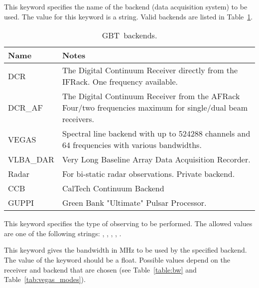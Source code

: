 \begin{description}[leftmargin=*,font=\bfseries\large]
\item[backend] This keyword specifies the name of the backend (data acquisition
system) to be used.  The value for this keyword is a string.  Valid backends are
listed in Table~\ref{table:backends}.

\begin{table}[!h]
\setlength{\abovecaptionskip}{0pt}\setlength{\belowcaptionskip}{0pt}
\begin{center}
\caption[GBT backends]{\gls{GBT}\ backends.\label{table:backends}}
\begin{tabular}{@{}l p{}}
\toprule
Name & Notes \\ \midrule
DCR & The Digital Continuum Receiver directly from the \gls{IFRack}.\newline
One frequency available.\\
\midrule
DCR\_AF & The Digital Continuum Receiver from the \gls{AFRack} \newline
          Four/two frequencies maximum for single/dual beam receivers. \\
\midrule
VEGAS  & Spectral line backend with up to 524288 channels and 64 \newline
frequencies with various bandwidths.\\
\midrule
VLBA\_DAR & Very Long Baseline Array Data Acquisition Recorder.\\
\midrule
Radar & For bi-static radar observations. Private backend.\\
\midrule
CCB & CalTech Continuum Backend  \\
\midrule
GUPPI  & Green Bank "Ultimate" Pulsar Processor.  \\
\bottomrule
\end{tabular}
\end{center}
\end{table}

\newpage

\item[obstype] This keyword specifies the type of observing to be performed.  The
allowed values are one of the following strings: ,
, , , .

\item[bandwidth] This keyword gives the bandwidth in MHz to be used by the
specified backend.  The value of the keyword should be a float.  Possible values
depend on the receiver and backend that are chosen (see Table~\ref{table:bw} and
Table~\ref{tab:vegas_modes}).


\end{description}
